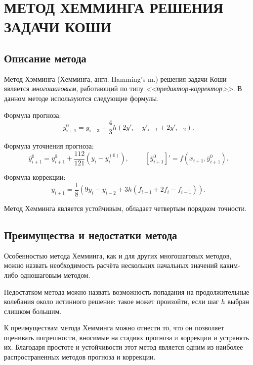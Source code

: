 \section[Метода Хемминга решения задачи Коши]
{МЕТОД ХЕММИНГА РЕШЕНИЯ ЗАДАЧИ КОШИ}

\subsection{Описание метода}

Метод Хэмминга (Хемминга, англ. Hamming's m.) решения задачи Коши является
\textit{многошаговым}, работающий по типу \textit{<<предиктор-корректор>>}.
В данном методе используются следующие формулы.

Формула прогноза:
$$
    y^{0}_{i+1} = y_{i-3} + \dfrac{4}{3} h (2 y'_i - y'_{i-1} + 2 y'_{i-2}).
$$

Формула уточнения прогноза:
$$
    \overline{y}^{0}_{i+1} = y^{0}_{i+1} + \dfrac{112}{121} (y_i - y^{(0)}_i), \hspace{1cm} [\overline{y}^{0}_{i+1}]' = f(x_{i+1}, \overline{y}^{0}_{i+1}).
$$

Формула коррекции:
$$
    y_{i+1} = \dfrac{1}{8} (9 y_i - y_{i-2} + 3h (f_{i+1} + 2f_i - f_{i-1})).
$$

Метод Хемминга является устойчивым, обладает четвертым порядком точности.


\subsection{Преимущества и недостатки метода}

Особенностью метода Хемминга, как и для других многошаговых методов,
можно назвать необходимость расчёта нескольких начальных значений каким-либо
одношаговым методом.

Недостатком метода можно назвать возможность попадания на продолжительные
колебания около истинного решение: такое может произойти, если шаг $h$ выбран
слишком большим.

К преимуществам метода Хемминга можно отнести то, что он позволяет
оценивать погрешности, вносимые на стадиях прогноза и коррекции и устранять их.
Благодаря простоте и устойчивости этот метод является одним из наиболее
распространенных методов прогноза и коррекции.

\pagebreak